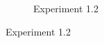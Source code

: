\begin{figure}[h!]
\begin{subfigure}{0.195\textwidth}
		\caption{Experiment 1.2}
    \end{subfigure}

\end{figure}
